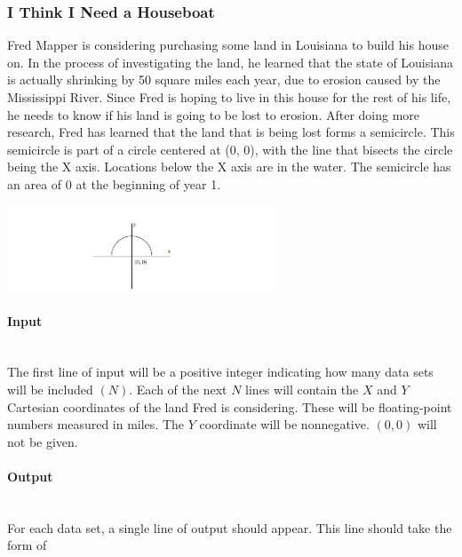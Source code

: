 \documentclass{article}
\begin{document}

\subsubsection{I Think I Need a Houseboat}

Fred Mapper is considering purchasing some land in Louisiana to build his house on. In the
process of investigating the land, he learned that the state of Louisiana is actually shrinking by
50 square miles each year, due to erosion caused by the Mississippi River. Since Fred is hoping to
live in this house for the rest of his life, he needs to know if his land is going to be lost to erosion.
After doing more research, Fred has learned that the land that is being lost forms a semicircle.
This semicircle is part of a circle centered at (0, 0), with the line that bisects the circle being the X axis. Locations below the X axis are in the water. The semicircle has an area of 0 at the beginning
of year 1. \\

\begin{center}
        \includegraphics[width=0.6\textwidth]{Figures/03.png}
\end{center}

\paragraph{Input} \mbox{} \\

The first line of input will be a positive integer indicating how many data sets will be included $(N)$. Each of the next $N$ lines will contain the $X$ and $Y$ Cartesian coordinates of the land Fred is considering. These will be floating-point numbers measured in miles. The $Y$ coordinate will be
nonnegative. $(0, 0)$ will not be given.

\paragraph{Output}\mbox{} \\

For each data set, a single line of output should appear. This line should take the form of
\end{document}
